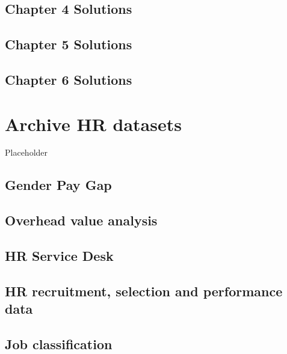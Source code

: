 \documentclass[12pt, krantz2,]{krantz}
\begin{document}
\hypertarget{chapter-4-solutions}{%
\section{Chapter 4 Solutions}\label{chapter-4-solutions}}

\hypertarget{chapter-5-solutions}{%
\section{Chapter 5 Solutions}\label{chapter-5-solutions}}

\hypertarget{chapter-6-solutions}{%
\section{Chapter 6 Solutions}\label{chapter-6-solutions}}

\hypertarget{appendixE}{%
\chapter{Archive HR datasets}\label{appendixE}}

Placeholder

\hypertarget{gender_pay_gap}{%
\section{Gender Pay Gap}\label{gender_pay_gap}}

\hypertarget{overhead}{%
\section{Overhead value analysis}\label{overhead}}

\hypertarget{service_desk_data}{%
\section{HR Service Desk}\label{service_desk_data}}

\hypertarget{HRrecruitment}{%
\section{HR recruitment, selection and performance data}\label{HRrecruitment}}

\hypertarget{job-classification}{%
\section{Job classification}\label{job-classification}}
\end{document}
